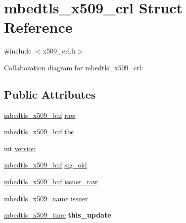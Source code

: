 \hypertarget{structmbedtls__x509__crl}{}\section{mbedtls\+\_\+x509\+\_\+crl Struct Reference}
\label{structmbedtls__x509__crl}


{\ttfamily \#include $<$x509\+\_\+crl.\+h$>$}



Collaboration diagram for mbedtls\+\_\+x509\+\_\+crl\+:
\subsection*{Public Attributes}
\begin{DoxyCompactItemize}
\item 
\mbox{\hyperlink{group__x509__module_ga4d02c9e8e4e2934555e0d132cd2976dc}{mbedtls\+\_\+x509\+\_\+buf}} \mbox{\hyperlink{structmbedtls__x509__crl_a6fb756d2b65237ccaff6061f4217b2eb}{raw}}
\item 
\mbox{\hyperlink{group__x509__module_ga4d02c9e8e4e2934555e0d132cd2976dc}{mbedtls\+\_\+x509\+\_\+buf}} \mbox{\hyperlink{structmbedtls__x509__crl_ab8086dd1a2a3d82363cc91e1cdfb5850}{tbs}}
\item 
int \mbox{\hyperlink{structmbedtls__x509__crl_aaf0d47225a63a5d9bf0e2e99d641e72d}{version}}
\item 
\mbox{\hyperlink{group__x509__module_ga4d02c9e8e4e2934555e0d132cd2976dc}{mbedtls\+\_\+x509\+\_\+buf}} \mbox{\hyperlink{structmbedtls__x509__crl_ad21b69052f214be907ceb84a9274b9f2}{sig\+\_\+oid}}
\item 
\mbox{\hyperlink{group__x509__module_ga4d02c9e8e4e2934555e0d132cd2976dc}{mbedtls\+\_\+x509\+\_\+buf}} \mbox{\hyperlink{structmbedtls__x509__crl_a009d0e1b844df85a2389ec10b770a6f6}{issuer\+\_\+raw}}
\item 
\mbox{\hyperlink{group__x509__module_ga2272228c7776102328df31623af3168c}{mbedtls\+\_\+x509\+\_\+name}} \mbox{\hyperlink{structmbedtls__x509__crl_aae988566d13fadf805d8ad31d13b44d8}{issuer}}
\item 
\mbox{\label{structmbedtls__x509__crl_a61c51dd535f4f954e04f5de02fe1065e}} 
\mbox{\hyperlink{structmbedtls__x509__time}{mbedtls\+\_\+x509\+\_\+time}} {\bfseries this\+\_\+update}
\item 
\mbox{\label{structmbedtls__x509__crl_a87b72e6cb62919b6172d3f100b9d09ea}} 

\end{DoxyCompactItemize}
